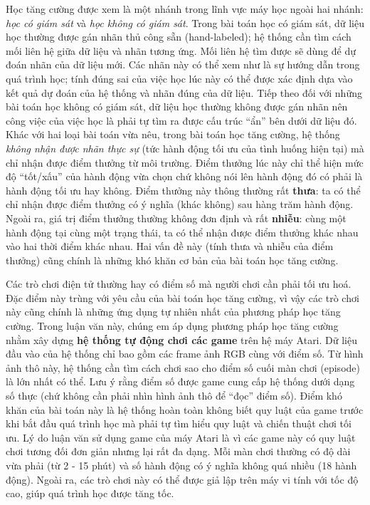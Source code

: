 Học tăng cường được xem là một nhánh trong lĩnh vực máy học ngoài hai nhánh: \textit{học có giám sát} và \textit{học không có giám sát}. 
Trong bài toán học có giám sát, dữ liệu học thường được gán nhãn thủ công sẵn (hand-labeled); hệ thống cần tìm cách mối liên hệ giữa dữ liệu và nhãn tương ứng.
Mối liên hệ tìm được sẽ dùng để dự đoán nhãn của dữ liệu mới.
Các nhãn này có thể xem như là sự hướng dẫn trong quá trình học; tính đúng sai của việc học lúc này có thể được xác định dựa vào kết quả dự đoán của hệ thống và nhãn đúng của dữ liệu. 
Tiếp theo đối với những bài toán học không có giám sát, dữ liệu học thường không được gán nhãn nên công việc của việc học là phải tự tìm ra được cấu trúc ``ẩn'' bên dưới dữ liệu đó. 
Khác với hai loại bài toán vừa nêu, trong bài toán học tăng cường, hệ thống \textit{không nhận được nhãn thực sự} (tức hành động tối ưu của tình huống hiện tại) mà chỉ nhận được điểm thưởng từ môi trường. 
Điểm thưởng lúc này chỉ thể hiện mức độ ``tốt/xấu'' của hành động vừa chọn chứ không nói lên hành động đó có phải là hành động tối ưu hay không. 
Điểm thưởng này thông thường rất \textbf{thưa}: ta có thể chỉ nhận được điểm thưởng có ý nghĩa (khác không) sau hàng trăm hành động. 
Ngoài ra, giá trị điểm thưởng thường không đơn định và rất \textbf{nhiễu}: cùng một hành động tại cùng một trạng thái, ta có thể nhận được điểm thưởng khác nhau vào hai thời điểm khác nhau. 
Hai vấn đề này (tính thưa và nhiễu của điểm thưởng) cũng chính là những khó khăn cơ bản của bài toán học tăng cường.

Các trò chơi điện tử thường hay có điểm số mà người chơi cần phải tối ưu hoá. 
Đặc điểm này trùng với yêu cầu của bài toán học tăng cường, vì vậy các trò chơi này cũng chính là những ứng dụng tự nhiên nhất của phương pháp học tăng cường. 
Trong luận văn này, chúng em áp dụng phương pháp học tăng cường nhằm xây dựng \textbf{hệ thống tự động chơi các game} trên hệ máy Atari. 
Dữ liệu đầu vào của hệ thống chỉ bao gồm các frame ảnh RGB cùng với điểm số. 
Từ hình ảnh thô này, hệ thống cần tìm cách chơi sao cho điểm số cuối màn chơi (episode) là lớn nhất có thể.
Lưu ý rằng điểm số được game cung cấp hệ thống dưới dạng số thực (chứ không cần phải nhìn hình ảnh thô để ``đọc'' điểm số).
Điểm khó khăn của bài toán này là hệ thống hoàn toàn không biết quy luật của game trước khi bắt đầu quá trình học mà phải tự tìm hiểu quy luật và chiến thuật chơi tối ưu. 
Lý do luận văn sử dụng game của máy Atari là vì các game này có quy luật chơi tương đối đơn giản nhưng lại rất đa dạng. 
Mỗi màn chơi thường có độ dài vừa phải (từ 2 - 15 phút) và số hành động có ý nghĩa không quá nhiều (18 hành động). 
Ngoài ra, các trò chơi này có thể được giả lập trên máy vi tính với tốc độ cao, giúp quá trình học được tăng tốc.


